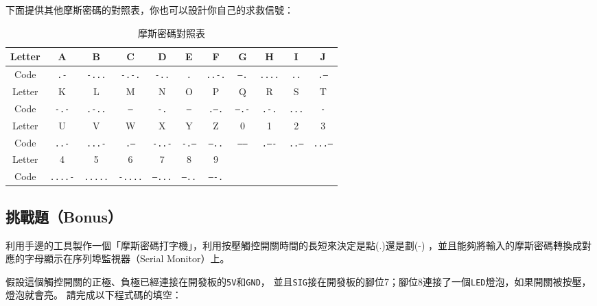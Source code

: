 \documentclass[12pt,a4paper]{article}
\begin{document}
下面提供其他摩斯密碼的對照表，你也可以設計你自己的求救信號：
\begin{table}[h!]
\centering
\begin{tabular}{|c|c|c|c|c|c|c|c|c|c|c|}
\hline
Letter & A   & B    & C    & D   & E   & F   & G    & H    & I    & J    \\ \hline
Code  & \texttt{.-}  & \texttt{-...} & \texttt{-.-.} & \texttt{-..} & \texttt{.}   & \texttt{..-.} & \texttt{--.}  & \texttt{....} & \texttt{..}   & \texttt{.---} \\ \hline
Letter & K   & L    & M    & N   & O   & P   & Q    & R    & S    & T    \\ \hline
Code  & \texttt{-.-} & \texttt{.-..} & \texttt{--}   & \texttt{-.}  & \texttt{---} & \texttt{.--.} & \texttt{--.-} & \texttt{.-.}  & \texttt{...}  & \texttt{-}    \\ \hline
Letter & U   & V    & W    & X   & Y   & Z   & 0    & 1    & 2    & 3    \\ \hline
Code  & \texttt{..-} & \texttt{...-} & \texttt{.--}  & \texttt{-..-} & \texttt{-.--} & \texttt{--..} & \texttt{-----} & \texttt{.----} & \texttt{..---} & \texttt{...--} \\ \hline
Letter & 4   & 5    & 6    & 7   & 8   & 9   &      &      &      &      \\ \hline
Code  & \texttt{....-} & \texttt{.....} & \texttt{-....} & \texttt{--...} & \texttt{---..} & \texttt{----.} &      &      &      &      \\ \hline
\end{tabular}
\caption{摩斯密碼對照表}
\label{tab:morse_table}
\end{table}


\newpage
\subsection{挑戰題（Bonus）}

利用手邊的工具製作一個「摩斯密碼打字機」，利用按壓觸控開關時間的長短來決定是點(.)還是劃(-)
，並且能夠將輸入的摩斯密碼轉換成對應的字母顯示在序列埠監視器（Serial Monitor）上。

假設這個觸控開關的正極、負極已經連接在開發板的\texttt{5V}和\texttt{GND}，
並且\texttt{SIG}接在開發板的腳位7；腳位8連接了一個\texttt{LED}燈泡，如果開關被按壓，燈泡就會亮。
請完成以下程式碼的填空：
\end{document}

